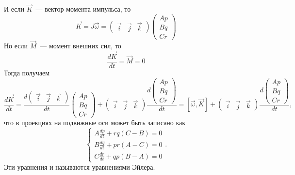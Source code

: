 \documentclass{article}
\begin{document}
И если \begin{math} \vec{K} \end{math}~--- вектор момента импульса, то
\begin{equation}
\vec{K}=J\vec{\omega}=
\left( \begin{array}{lcr} \vec{i} & \vec{j} & \vec{k} \end{array} \right)
\left( \begin{array}{lcr} A p\\B q\\C r \end{array} \right)
\end{equation}
Но если \begin{math} \vec{M} \end{math}~--- момент внешних сил, то
\begin{equation}
\frac{d\vec{K}}{dt}=\vec{M}=0
\end{equation}
Тогда получаем
\begin{equation}
\frac{d\vec{K}}{dt}=
\frac{d\left( \begin{array}{lcr} \vec{i} & \vec{j} & \vec{k} \end{array} \right)}{dt}\left( \begin{array}{lcr} A p\\B q\\C r \end{array} \right)+
\left( \begin{array}{lcr} \vec{i} & \vec{j} & \vec{k} \end{array} \right)\frac{d\left( \begin{array}{lcr} A p\\B q\\C r \end{array} \right)}{dt}=
[\vec{\omega}, \vec{K}] + \left( \begin{array}{lcr} \vec{i} & \vec{j} & \vec{k} \end{array} \right)\frac{d\left( \begin{array}{lcr} A p\\B q\\C r \end{array} \right)}{dt},
\end{equation}
что в проекциях на подвижные оси может быть записано как
% 
\begin{equation}
\label{EulerEquations}
\left\{
\begin{array}{c}
A\frac{dp}{dt}+rq(C-B)=0\\
B\frac{dq}{dt}+pr(A-C)=0\\
C\frac{dr}{dt}+qp(B-A)=0
\end{array}
\right.
.
\end{equation}
Эти уравнения и называются уравнениями Эйлера.
\end{document}
